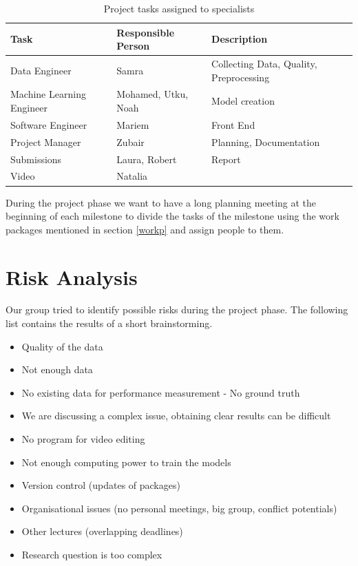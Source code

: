 \documentclass[lang=english,inputenc=utf8,fontsize=10pt]{ldvarticle}
\begin{document}
\begin{table}[ht]
\begin{tabular}{l|l|l}
Task                      & Responsible Person  & Description                             \\ \hline
Data Engineer             & Samra               & Collecting Data, Quality, Preprocessing \\
Machine Learning Engineer & Mohamed, Utku, Noah & Model creation                          \\
Software Engineer         & Mariem              & Front End                               \\
Project Manager           & Zubair              & Planning, Documentation                 \\
Submissions               & Laura, Robert       & Report                                  \\
Video                     & Natalia             &                                        
\end{tabular}
\caption{Project tasks assigned to specialists}
\label{tab:special}
\end{table}
During the project phase we want to have a long planning meeting at the beginning of each milestone to divide the tasks of the milestone using the work packages mentioned in section \ref{workp} and assign people to them.\\

\newpage

\section{Risk Analysis}
Our group tried to identify possible risks during the project phase. The following list contains the results of a short brainstorming.\\

\begin{itemize}
    \item Quality of the data
    \item Not enough data
    \item No existing data for performance measurement - No ground truth
    \item We are discussing a complex issue, obtaining clear results can be difficult
    \item No program for video editing
    \item Not enough computing power to train the models
    \item Version control (updates of packages)
    \item Organisational issues (no personal meetings, big group, conflict potentials)
    \item Other lectures (overlapping deadlines)
    \item Research question is too complex
\end{itemize}
\end{document}
